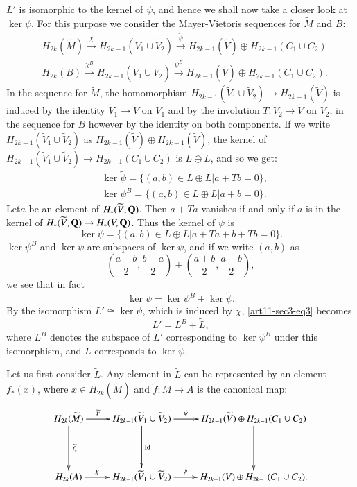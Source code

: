 $L'$ is isomorphic to the kernel of $\psi$, and hence we shall now take a closer look at $\ker \psi$. For this purpose we consider the Mayer-Vietoris sequences for $\widetilde{M}$ and $B$:
\begin{align*}
& H_{2k}(\widetilde{M})\xrightarrow{\widetilde{\chi}}H_{2k-1}(\widetilde{V}_{1}\cup \widetilde{V}_{2})\xrightarrow{\widetilde{\psi}}H_{2k-1}(\widetilde{V})\oplus H_{2k-1}(C_{1}\cup C_{2})\\[4pt]
& H_{2k}(B)\xrightarrow{\chi^{B}}H_{2k-1}(\widetilde{V}_{1}\cup \widetilde{V}_{2})\xrightarrow{\psi^{B}}H_{2k-1}(\widetilde{V})\oplus H_{2k-1}(C_{1}\cup C_{2}).
\end{align*}
In the sequence for $\widetilde{M}$, the homomorphism $H_{2k-1}(\widetilde{V}_{1}\cup \widetilde{V}_{2})\to H_{2k-1}(\widetilde{V})$ is induced by the identity $\widetilde{V}_{1}\to \widetilde{V}$ on $\widetilde{V}_{1}$ and by the involution $T:\widetilde{V}_{2}\to \widetilde{V}$ on $\widetilde{V}_{2}$, in the sequence for $B$ however by the identity on both components. If we write $H_{2k-1}(\widetilde{V}_{1}\cup \widetilde{V}_{2})$ as $H_{2k-1}(\widetilde{V})\oplus H_{2k-1}(\widetilde{V})$, the kernel of $H_{2k-1}(\widetilde{V}_{1}\cup \widetilde{V}_{2})\to H_{2k-1}(C_{1}\cup C_{2})$ is $L\oplus L$, and so we get:
\begin{align*}
&\ker \widetilde{\psi}=\{(a,b)\in L\oplus L | a+Tb=0\},\\
&\ker \psi^{B}=\{(a,b)\in L\oplus L | a+b=0\}.
\end{align*}
Let\pageoriginale $a$ be an element of $H_{*}(\widetilde{V},\mathbf{Q})$. Then $a+Ta$ vanishes if and only if $a$ is in the kernel of $H_{*}(\widetilde{V},\mathbf{Q})\to H_{*}(V,\mathbf{Q})$. Thus the kernel of $\psi$ is
$$
\ker \psi=\{(a,b)\in L\oplus L |a+Ta+b+Tb=0\}.
$$
$\ker \psi^{B}$ and $\ker \widetilde{\psi}$ are subspaces of $\ker \psi$, and if we write $(a,b)$ as 
$$
\left(\dfrac{a-b}{2},\dfrac{b-a}{2}\right)+\left(\dfrac{a+b}{2},\dfrac{a+b}{2}\right),
$$ 
we see that in fact
\begin{equation*}
\ker \psi = \ker \psi^{B}+\ker \widetilde{\psi}.\tag{3}\label{art11-sec3-eq3}
\end{equation*}
By the isomorphism $L'\cong \ker \psi$, which is induced by $\chi$, \eqref{art11-sec3-eq3} becomes
$$
L'=L^{B}+\widetilde{L},
$$
where $L^{B}$ denotes the subspace of $L'$ corresponding to $\ker \psi^{B}$ under this isomorphism, and $\widetilde{L}$ corresponds to $\ker \widetilde{\psi}$.

Let us first consider $\widetilde{L}$. Any element in $\widetilde{L}$ can be represented by an element $\widetilde{f}_{*}(x)$, where $x\in H_{2k}(\widetilde{M})$ and $\widetilde{f}:\widetilde{M}\to A$ is the canonical map:
\[
\xymatrix@R=1.5cm{
H_{2k}(\widetilde{M})\ar[d]^-{\widetilde{f}_{*}}\ar[r]^-{\widetilde{\chi}} & H_{2k-1}(\widetilde{V}_{1}\cup \widetilde{V}_{2})\ar[d]^-{\text{Id}}\ar[r]^-{\widetilde{\psi}} & H_{2k-1}(\widetilde{V})\oplus H_{2k-1}(C_{1}\cup C_{2})\ar[d]\\
H_{2k}(A)\ar[r]^-{\chi} & H_{2k-1}(\widetilde{V}_{1}\cup \widetilde{V}_{2})\ar[r]^-{\psi} & H_{2k-1}(V)\oplus H_{2k-1}(C_{1}\cup C_{2}).
}
\]

